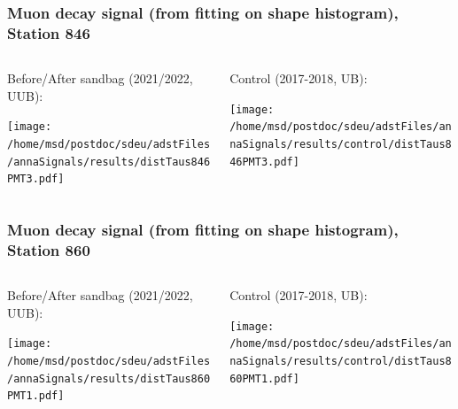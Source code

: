 \documentclass[aspectratio=169]{beamer}
\begin{document}
\begin{frame}
  \frametitle{Muon decay signal (from fitting on shape histogram), Station 846}
  
  \begin{columns}[T,c]
    \begin{column}{.5\textwidth}
      Before/After sandbag (2021/2022, UUB):
      \vspace{.3cm}

      \texttt{[image: /home/msd/postdoc/sdeu/adstFiles/annaSignals/results/distTaus846PMT3.pdf]}
    \end{column}
    \begin{column}{.5\textwidth}
      Control (2017-2018, UB):
      \vspace{0.3cm}

      \texttt{[image: /home/msd/postdoc/sdeu/adstFiles/annaSignals/results/control/distTaus846PMT3.pdf]}
    \end{column}    
\end{columns}
\end{frame}


\begin{frame}
  \frametitle{Muon decay signal (from fitting on shape histogram), Station 860}
  
  \begin{columns}[T,c]
    \begin{column}{.5\textwidth}
      Before/After sandbag (2021/2022, UUB):
      \vspace{.3cm}

      \texttt{[image: /home/msd/postdoc/sdeu/adstFiles/annaSignals/results/distTaus860PMT1.pdf]}
    \end{column}
    \begin{column}{.5\textwidth}
      Control (2017-2018, UB):
      \vspace{0.3cm}

      \texttt{[image: /home/msd/postdoc/sdeu/adstFiles/annaSignals/results/control/distTaus860PMT1.pdf]}
    \end{column}
  \end{columns}
\end{frame}
\end{document}
